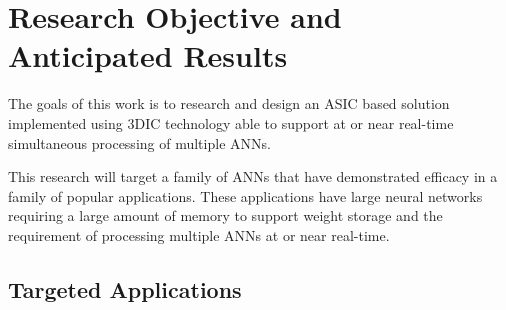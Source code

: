 


\section{Research Objective and Anticipated Results}
\label{chap-three}

The goals of this work is to research and design an ASIC based solution implemented using 3DIC technology able to support at or near real-time simultaneous 
processing of multiple ANNs.

This research will target a family of ANNs that have demonstrated efficacy in
a family of popular applications. These applications have large neural networks requiring a large amount of memory 
to support weight storage and the requirement of processing multiple ANNs at or near real-time.

\vspace{-3mm}
\subsection*{Targeted Applications}
\label{sec:Targeted Applications}

